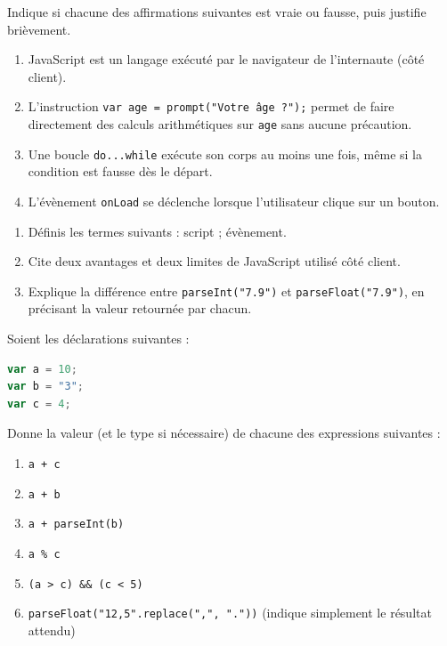 \documentclass[11pt]{article}
\newcommand{\cle}[1]{{\popxbold\color{popdark}#1}}
\begin{document}
\begin{exercice}
Indique si chacune des affirmations suivantes est vraie ou fausse, puis justifie brièvement.
\begin{enumerate}
\item JavaScript est un langage exécuté par le navigateur de l'internaute (côté client).
\item L'instruction \texttt{var age = prompt("Votre âge ?");} permet de faire directement des calculs arithmétiques sur \texttt{age} sans aucune précaution.
\item Une boucle \texttt{do...while} exécute son corps au moins une fois, même si la condition est fausse dès le départ.
\item L'évènement \texttt{onLoad} se déclenche lorsque l'utilisateur clique sur un bouton.
\end{enumerate}
\end{exercice}

\begin{exercice}
\begin{enumerate}
\item Définis les termes suivants : \cle{script} ; \cle{évènement}.
\item Cite deux avantages et deux limites de JavaScript utilisé côté client.
\item Explique la différence entre \texttt{parseInt("7.9")} et \texttt{parseFloat("7.9")}, en précisant la valeur retournée par chacun.
\end{enumerate}
\end{exercice}

\begin{exercice}
Soient les déclarations suivantes :
\begin{lstlisting}[language=JavaScript]
var a = 10;
var b = "3";
var c = 4;
\end{lstlisting}
Donne la valeur (et le type si nécessaire) de chacune des expressions suivantes :
\begin{enumerate}
\item \texttt{a + c}
\item \texttt{a + b}
\item \texttt{a + parseInt(b)}
\item \texttt{a \% c}
\item \texttt{(a > c) \&\& (c < 5)}
\item \texttt{parseFloat("12,5".replace(",", "."))} (indique simplement le résultat attendu)
\end{enumerate}
\end{exercice}
\end{document}
